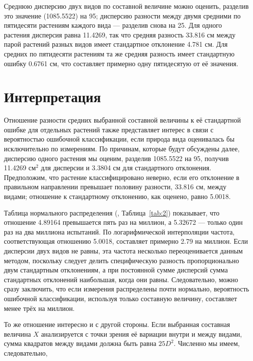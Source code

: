 \documentclass[12pt]{article}
\begin{document}
Среднюю дисперсию двух видов по составной величине можно оценить, разделив это значение (1085.5522) на 95; дисперсию разности между двумя средними по пятидесяти растениям каждого вида — разделив снова на 25. Для одного растения дисперсия равна 11.4269, так что средняя разность 33.816 см между парой растений разных видов имеет стандартное отклонение 4.781 см. Для средних по пятидесяти растениям та же средняя разность имеет стандартную ошибку 0.6761 см, что составляет примерно одну пятидесятую от её значения.
\section{Интерпретация}

Отношение разности средних выбранной составной величины к её стандартной ошибке для отдельных растений также представляет интерес в связи с вероятностью ошибочной классификации, если природа вида оценивалась бы исключительно по измерениям.  
По причинам, которые будут обсуждены далее, дисперсию одного растения мы оценим, разделив 1085.5522 на 95, получив 11.4269 см$^2$ для дисперсии и 3.3804 см для стандартного отклонения. Предположим, что растение классифицировано неверно, если его отклонение в правильном направлении превышает половину разности, 33.816 см, между видами; отношение к стандартному отклонению, как оценено, равно 5.0018.

Таблица нормального распределения (\textit{}, Таблица~\ref{tab:2}) показывает, что отношение 4.89164 превышается пять раз на миллион, а 5.32672 — только один раз на два миллиона испытаний.  
По логарифмической интерполяции частота, соответствующая отношению 5.0018, составляет примерно 2.79 на миллион.  
Если дисперсии двух видов не равны, эта частота несколько переоценивается данным методом, поскольку следует делить специфическую разность пропорционально двум стандартным отклонениям, а при постоянной сумме дисперсий сумма стандартных отклонений наибольшая, когда они равны.  
Следовательно, можно сразу заключить, что если измерения распределены почти нормально, вероятность ошибочной классификации, используя только составную величину, составляет менее трёх на миллион.

То же отношение интересно и с другой стороны. Если выбранная составная величина $X$ анализируется с точки зрения её вариации внутри и между видами, сумма квадратов между видами должна быть равна $25 D^2$.  
Численно мы имеем, следовательно,
\end{document}
